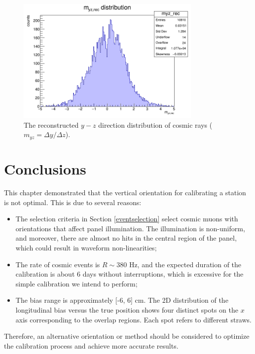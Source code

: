 \begin{figure}[!h]
    \centering
    \includegraphics[width=0.8\textwidth]{figures/png/myz_rec.png}
    \caption{The reconstructed $y-z$ direction distribution of cosmic rays ($m_{yz}=\Delta y /\Delta z$).}
    \label{fig:myzrec}
\end{figure}
\section{Conclusions}
This chapter demonstrated that the vertical orientation for calibrating a station is not optimal. This is due to several reasons:
\begin{itemize}
    \item The selection criteria in Section \ref{eventselection} select cosmic muons with orientations that affect panel illumination. 
    The illumination is non-uniform, and moreover, there are almost no hits in the central region of the panel, which could result in waveform non-linearities;
    \item The rate of cosmic events is $R \sim 380$ Hz, and the expected duration of the calibration is about 6 days without interruptions, 
    which is excessive for the simple calibration we intend to perform;
    \item The bias range is approximately [-6, 6] cm. The 2D distribution of the longitudinal bias versus the true position shows 
    four distinct spots on the $x$ axis corresponding to the overlap regions. Each spot refers to different straws.
\end{itemize}
Therefore, an alternative orientation or method should be considered to optimize the calibration process and achieve more accurate results.







